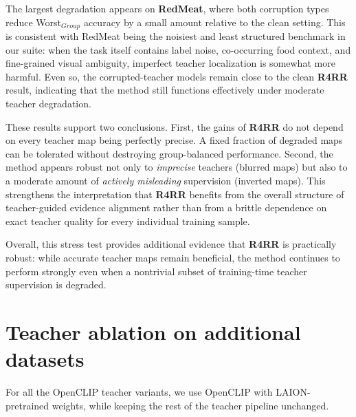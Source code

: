 \documentclass[10pt,twocolumn,letterpaper]{article}
\begin{document}
The largest degradation appears on \textbf{RedMeat}, where both corruption types reduce Worst$_{Group}$ accuracy by a small amount relative to the clean setting. This is consistent with RedMeat being the noisiest and least structured benchmark in our suite: when the task itself contains label noise, co-occurring food context, and fine-grained visual ambiguity, imperfect teacher localization is somewhat more harmful. Even so, the corrupted-teacher models remain close to the clean \textbf{R4RR} result, indicating that the method still functions effectively under moderate teacher degradation.

These results support two conclusions. First, the gains of \textbf{R4RR} do not depend on every teacher map being perfectly precise. A fixed fraction of degraded maps can be tolerated without destroying group-balanced performance. Second, the method appears robust not only to \emph{imprecise} teachers (blurred maps) but also to a moderate amount of \emph{actively misleading} supervision (inverted maps). This strengthens the interpretation that \textbf{R4RR} benefits from the overall structure of teacher-guided evidence alignment rather than from a brittle dependence on exact teacher quality for every individual training sample.

Overall, this stress test provides additional evidence that \textbf{R4RR} is practically robust: while accurate teacher maps remain beneficial, the method continues to perform strongly even when a nontrivial subset of training-time teacher supervision is degraded.




\section{Teacher ablation on additional datasets}\label{appendix:vlmablation}

For all the OpenCLIP teacher variants, we use OpenCLIP with LAION-pretrained weights, while keeping the rest of the teacher pipeline unchanged.
\end{document}
